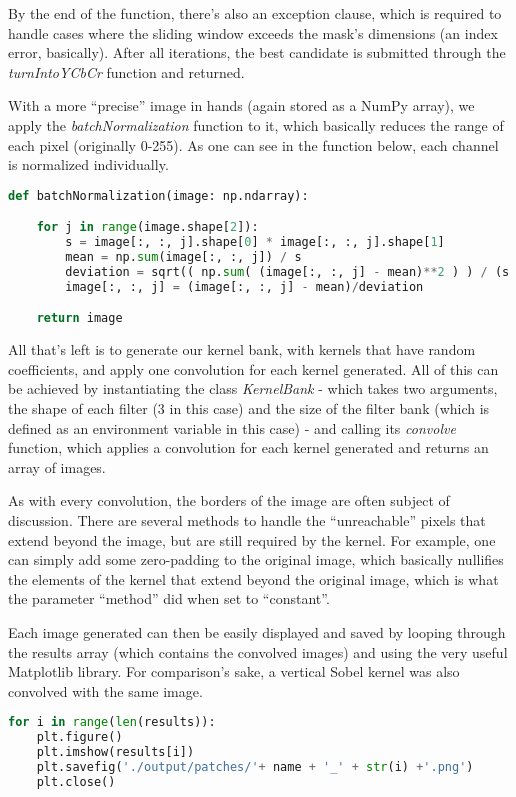 \documentclass[11pt]{IEEEtran}
\begin{document}
By the end of the function, there's also an exception clause, which is required to handle cases where the sliding window exceeds the mask's dimensions (an index error, basically). After all iterations, the best candidate is submitted through the \textit{turnIntoYCbCr} function and returned.

With a more ``precise'' image in hands (again stored as a NumPy array), we apply the \textit{batchNormalization} function to it, which basically reduces the range of each pixel (originally 0-255). As one can see in the function below, each channel is normalized individually.

\begin{lstlisting}[language=Python]
def batchNormalization(image: np.ndarray):

    for j in range(image.shape[2]):
        s = image[:, :, j].shape[0] * image[:, :, j].shape[1]
        mean = np.sum(image[:, :, j]) / s
        deviation = sqrt(( np.sum( (image[:, :, j] - mean)**2 ) ) / (s - 1))
        image[:, :, j] = (image[:, :, j] - mean)/deviation

    return image
\end{lstlisting}

All that's left is to generate our kernel bank, with kernels that have random coefficients, and apply one convolution for each kernel generated. All of this can be achieved by instantiating the class \textit{KernelBank} - which takes two arguments, the shape of each filter (3 in this case) and the size of the filter bank (which is defined as an environment variable in this case) - and calling its \textit{convolve} function, which applies a convolution for each kernel generated and returns an array of images.

As with every convolution, the borders of the image are often subject of discussion. There are several methods to handle the ``unreachable'' pixels that extend beyond the image, but are still required by the kernel. For example, one can simply add some zero-padding to the original image, which basically nullifies the elements of the kernel that extend beyond the original image, which is what the parameter ``method'' did when set to ``constant''.

Each image generated can then be easily displayed and saved by looping through the results array (which contains the convolved images) and using the very useful Matplotlib library. For comparison's sake, a vertical Sobel kernel was also convolved with the same image.

\begin{lstlisting}[language=Python]
for i in range(len(results)):
    plt.figure()
    plt.imshow(results[i])
    plt.savefig('./output/patches/'+ name + '_' + str(i) +'.png')
    plt.close()
\end{lstlisting}
\end{document}
